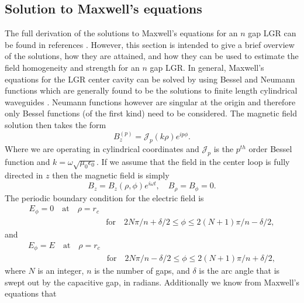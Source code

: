 \subsection{Solution to Maxwell's equations} \label{fields}

The full derivation of the solutions to Maxwell's equations for an $n$ gap LGR can be found in references \cite{piasecki1993field, mehdizadeh1989Electromagnetic, mehdizadeh1983investigation}. However, this section is intended to give a brief overview of the solutions, how they are attained, and how they can be used to estimate the field homogeneity and strength for an $n$ gap LGR. In general, Maxwell's equations for the LGR center cavity can be solved by using Bessel and Neumann functions which are generally found to be the solutions to finite length cylindrical waveguides \cite{gardiol1985open}. Neumann functions however are singular at the origin and therefore only Bessel functions (of the first kind) need to be considered. The magnetic field solution then takes the form
\begin{equation} \label{solution1}
B_z^{(p)} = \mathcal{J}_p(k\rho) e^{i p \phi}.
\end{equation}
Where we are operating in cylindrical coordinates and $\mathcal{J}_p$ is the $p^{th}$ order Bessel function and $k = \omega \sqrt{\mu_0\epsilon_0}$. If we assume that the field in the center loop is fully directed in $z$ then the magnetic field is simply
\begin{equation}\label{boundary1}
B_z = B_z(\rho,\phi)e^{i\omega t}, \quad B_{\rho} = B_{\phi} = 0.
\end{equation} 
The periodic boundary condition for the electric field is
\begin{equation}\label{maxwell1}
\begin{split}
E_\phi = 0 \quad \text{at} \quad \rho = r_c \\
& \text{for} \quad 2N\pi/n + \delta/2 \leqslant \phi \leqslant 2(N+1)\pi/n-\delta/2,
\end{split}
\end{equation}
and
\begin{equation}\label{maxwell2}
\begin{split}
E_\phi = E \quad \text{at} \quad \rho = r_c \\
& \text{for} \quad 2N\pi/n - \delta/2 \leqslant \phi \leqslant 2(N+1)\pi/n+\delta/2,
\end{split}
\end{equation}
where $N$ is an integer, $n$ is the number of gaps, and $\delta$ is the arc angle that is swept out by the capacitive gap, in radians. Additionally we know from Maxwell's equations that

